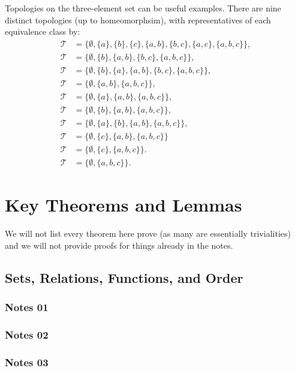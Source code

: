 \documentclass[12pt,letterpaper,reqno]{article}
\begin{document}
Topologies on the three-element set can be useful examples. There are nine distinct topologies (up to homeomorphsim), with representatives of each equivalence class by:
\begin{align*}\label{topology:3-element-topology}
    \mathcal{T} &= \{ \emptyset, \{ a\}, \{b\}, \{c \}, \{a, b \}, \{b, c \}, \{a, c \}, \{a, b, c \} \}, \\
    \mathcal{T} &= \{ \emptyset, \{b \}, \{a, b \}, \{b, c \}, \{a, b, c \} \}, \\ 
    \mathcal{T} &= \{ \emptyset, \{b \}, \{a \}, \{a, b \}, \{b, c \}, \{a, b, c \} \}, \\
    \mathcal{T} &= \{ \emptyset, \{a, b\}, \{a, b, c \} \}, \\
    \mathcal{T} &= \{ \emptyset, \{a \}, \{a, b\}, \{a, b, c \} \}, \\
    \mathcal{T} &= \{ \emptyset, \{ b \}, \{a, b\}, \{a, b, c \} \}, \\
    \mathcal{T} &= \{ \emptyset, \{a \}, \{ b \}, \{a, b\}, \{a, b, c \} \}, \\
    \mathcal{T} &= \{ \emptyset, \{c \}, \{a, b\}, \{a, b, c \} \} \\
    \mathcal{T} &= \{ \emptyset, \{c\}, \{a, b, c \} \}. \\
    \mathcal{T} &= \{ \emptyset, \{a, b, c \} \}.
\end{align*}

\newpage
\section{Key Theorems and Lemmas}

We will not list every theorem here prove (as many are essentially trivialities) and we will not provide proofs for things already in the notes. 

\subsection{Sets, Relations, Functions, and Order}

\subsubsection{Notes 01}

\subsubsection{Notes 02}

\subsubsection{Notes 03}
\end{document}
